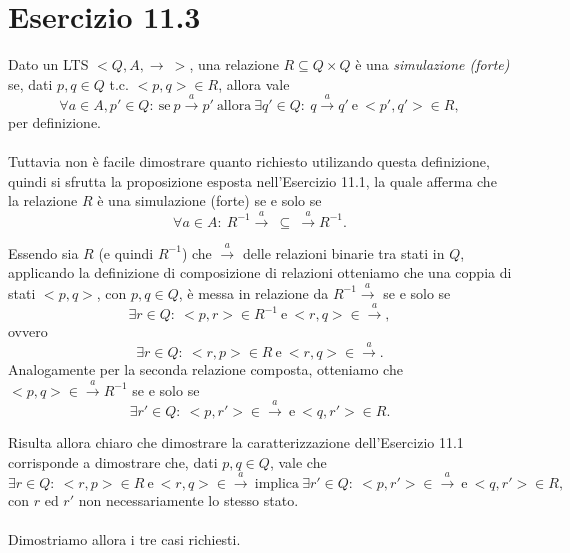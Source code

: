 \section*{Esercizio 11.3}

    
    Dato un LTS $<Q,A,\rightarrow\ >$, una relazione $R \subseteq Q \times Q$ è una \textit{simulazione (forte)} se, dati $p,q\in Q$ t.c. $<p,q>\in R$, allora vale
    \begin{equation*}
        \forall a\in A, p' \in Q:\ \mbox{se}\ p\xrightarrow{a}p'\ \mbox{allora}\ \exists q'\in Q:\ q\xrightarrow{a}q'\ \mbox{e}\ <p',q'>\in R,
    \end{equation*}
    per definizione.\\
    \\
    Tuttavia non è facile dimostrare quanto richiesto utilizando questa definizione, quindi si sfrutta la proposizione esposta nell'Esercizio 11.1, la quale afferma che la relazione $R$ è una simulazione (forte) se e solo se
    \begin{equation*}
        \forall a\in A:\ R^{-1}\xrightarrow{a} \ \subseteq \ \xrightarrow{a} R^{-1}.
    \end{equation*}
    
    Essendo sia $R$ (e quindi $R^{-1}$) che $\xrightarrow{a}$ delle relazioni binarie tra stati in $Q$, applicando la definizione di composizione di relazioni otteniamo che una coppia di stati $<p,q>$, con $p,q\in Q$, è messa in relazione da $R^{-1}\xrightarrow{a}$ se e solo se
    \begin{equation*}
        \exists r\in Q:\ <p,r>\in R^{-1}\ \mbox{e}\ <r,q>\in\xrightarrow{a},
    \end{equation*}
    ovvero
    \begin{equation*}
        \exists r\in Q:\ <r,p>\in R\ \mbox{e}\ <r,q>\in\xrightarrow{a}.
    \end{equation*}
    Analogamente per la seconda relazione composta, otteniamo che $<p,q>\in \xrightarrow{a}R^{-1}$ se e solo se
    \begin{equation*}
        \exists r'\in Q:\ <p,r'>\in\xrightarrow{a}\ \mbox{e}\ <q,r'>\in R.
    \end{equation*}
    
    Risulta allora chiaro che dimostrare la caratterizzazione dell'Esercizio 11.1 corrisponde a dimostrare che, dati $p,q\in Q$, vale che
    \begin{equation}
        \exists r\in Q:\ <r,p>\in R\ \mbox{e}\ <r,q>\in\xrightarrow{a}\ \mbox{implica}\ \exists r'\in Q:\ <p,r'>\in\xrightarrow{a}\ \mbox{e}\ <q,r'>\in R,
        \label{eq:simulazione}
    \end{equation}
    con $r$ ed $r'$ non necessariamente lo stesso stato.\\
    \\
    Dimostriamo allora i tre casi richiesti.
    
